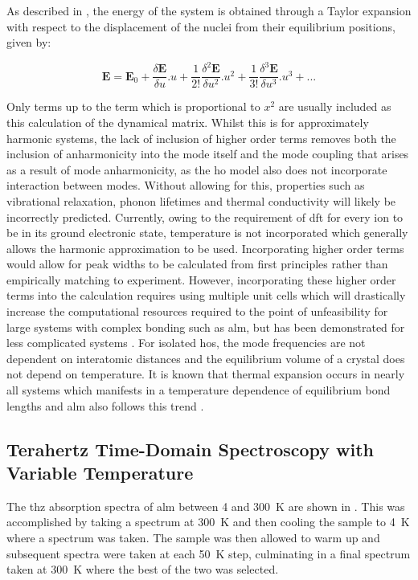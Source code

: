 As described in , the energy of the system is obtained through a Taylor expansion with respect to the displacement of the nuclei from their equilibrium positions, given by:

\begin{equation}
\boldsymbol{E} = \boldsymbol{E}_0 + \frac{\delta \boldsymbol{E}}{\delta u}.u + \frac{1}{2!} \frac{\delta^2 \boldsymbol{E}}{\delta u^2}.u^2 + \frac{1}{3!} \frac{\delta^3 \boldsymbol{E}}{\delta u^3}.u^3 + ...
\label{eqn:ETaylor2}
\end{equation}

Only terms up to the term which is proportional to \(x^2\) are usually included as this \DIFdelbegin {}\DIFdelend \DIFaddbegin {}\DIFaddend calculation of the dynamical matrix. Whilst this is \DIFdelbegin {}\DIFdelend \DIFaddbegin {}\DIFaddend for approximately harmonic systems, the lack of inclusion of higher order terms removes both the inclusion of anharmonicity into the mode itself and the mode coupling that arises as a result of mode anharmonicity, as the \acrshort{ho} model also does not incorporate interaction between modes. Without allowing for this, properties such as vibrational relaxation, phonon lifetimes and thermal conductivity will likely be incorrectly predicted. Currently, owing to the requirement of \acrshort{dft} for every ion to be in its ground electronic state, temperature is not incorporated which generally allows the harmonic approximation to be used. Incorporating higher order terms would allow for peak widths to be calculated from first principles rather than empirically matching to experiment. However, incorporating these higher order terms into the calculation requires using multiple unit cells which will drastically increase the computational resources required to the point of unfeasibility for large systems with complex bonding such as \acrshort{alm}, but has been demonstrated for less complicated systems \DIFdelbegin \DIFdel{~}\DIFdelend \cite{Erba2019}. For isolated \acrshort{ho}s, the mode frequencies are not dependent on interatomic distances and the equilibrium volume of a crystal does not depend on temperature. It is known that thermal expansion occurs in nearly all systems which manifests in a temperature dependence of equilibrium bond lengths and \acrshort{alm} also follows this trend \DIFdelbegin \DIFdel{~}\DIFdelend \cite{Smith2005, Schreyer2014}. 

\subsection{Terahertz Time-Domain Spectroscopy with Variable Temperature}
The \acrshort{thz} absorption spectra of \acrshort{alm} between 4 and \SI{300}{K} are shown in . This was accomplished by taking a spectrum at \SI{300}{K} and then cooling the sample to \SI{4}{K} where a spectrum was taken. The sample was then allowed to warm up and subsequent spectra were taken at each \SI{50}{K} step, culminating in a final spectrum taken at \SI{300}{K} where the best of the two was selected.

